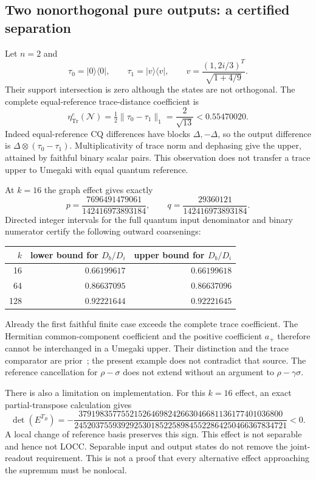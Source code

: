 \subsection{Two nonorthogonal pure outputs: a certified separation}
Let $n=2$ and
\[
 \tau_0=|0\rangle\langle0|,\qquad
 \tau_1=|v\rangle\langle v|,\qquad
 v=\frac{(1,2i/3)^T}{\sqrt{1+4/9}}.
\]
Their support intersection is zero although the states are not orthogonal. The complete equal-reference trace-distance coefficient is
\[
 \eta_{\operatorname{Tr}}^c(\mathcal N)
  =\tfrac12\|\tau_0-\tau_1\|_1=\frac2{\sqrt{13}}<0.55470020.
\]
Indeed equal-reference CQ differences have blocks $\Delta,-\Delta$, so the output difference is $\Delta\otimes(\tau_0-\tau_1)$. Multiplicativity of trace norm and dephasing give the upper, attained by faithful binary scalar pairs. This observation does not transfer a trace upper to Umegaki with equal quantum reference.

At $k=16$ the graph effect gives exactly
\[
 p=\frac{7696491479061}{142416973893184},\qquad
 q=\frac{29360121}{142416973893184}.
\]
Directed integer intervals for the full quantum input denominator and binary numerator certify the following outward coarsenings:
\begin{center}
\begin{tabular}{rrr}\toprule
$k$ & lower bound for $D_b/D_i$ & upper bound for $D_b/D_i$\\\midrule
16 & $0.66199617$ & $0.66199618$\\
64 & $0.86637095$ & $0.86637096$\\
128 & $0.92221644$ & $0.92221645$\\\bottomrule
\end{tabular}
\end{center}
Already the first faithful finite case exceeds the complete trace coefficient. The Hermitian common-component coefficient and the positive coefficient $a_+$ therefore cannot be interchanged in a Umegaki upper. Their distinction and the trace comparator are prior~\cite{GHNW}; the present example does not contradict that source. The reference cancellation for $\rho-\sigma$ does not extend without an argument to $\rho-\gamma\sigma$.

There is also a limitation on implementation. For this $k=16$ effect, an exact partial-transpose calculation gives
\[
 \det(E^{T_B})=
 -\frac{379198357755215264698242663046681136177401036800}
 {24520375593929253018522589845522864250466367834721}<0.
\]
A local change of reference basis preserves this sign. This effect is not separable and hence not LOCC. Separable input and output states do not remove the joint-readout requirement. This is not a proof that every alternative effect approaching the supremum must be nonlocal.

